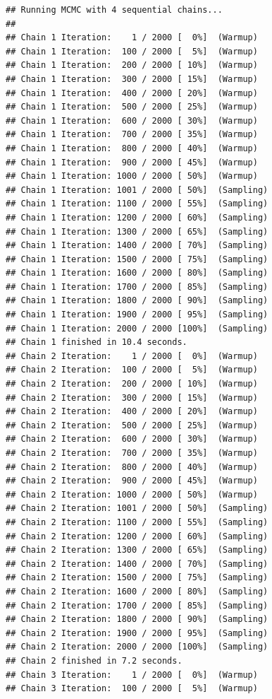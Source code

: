\documentclass[
]{article}
\begin{document}
\begin{verbatim}
## Running MCMC with 4 sequential chains...
## 
## Chain 1 Iteration:    1 / 2000 [  0%]  (Warmup) 
## Chain 1 Iteration:  100 / 2000 [  5%]  (Warmup) 
## Chain 1 Iteration:  200 / 2000 [ 10%]  (Warmup) 
## Chain 1 Iteration:  300 / 2000 [ 15%]  (Warmup) 
## Chain 1 Iteration:  400 / 2000 [ 20%]  (Warmup) 
## Chain 1 Iteration:  500 / 2000 [ 25%]  (Warmup) 
## Chain 1 Iteration:  600 / 2000 [ 30%]  (Warmup) 
## Chain 1 Iteration:  700 / 2000 [ 35%]  (Warmup) 
## Chain 1 Iteration:  800 / 2000 [ 40%]  (Warmup) 
## Chain 1 Iteration:  900 / 2000 [ 45%]  (Warmup) 
## Chain 1 Iteration: 1000 / 2000 [ 50%]  (Warmup) 
## Chain 1 Iteration: 1001 / 2000 [ 50%]  (Sampling) 
## Chain 1 Iteration: 1100 / 2000 [ 55%]  (Sampling) 
## Chain 1 Iteration: 1200 / 2000 [ 60%]  (Sampling) 
## Chain 1 Iteration: 1300 / 2000 [ 65%]  (Sampling) 
## Chain 1 Iteration: 1400 / 2000 [ 70%]  (Sampling) 
## Chain 1 Iteration: 1500 / 2000 [ 75%]  (Sampling) 
## Chain 1 Iteration: 1600 / 2000 [ 80%]  (Sampling) 
## Chain 1 Iteration: 1700 / 2000 [ 85%]  (Sampling) 
## Chain 1 Iteration: 1800 / 2000 [ 90%]  (Sampling) 
## Chain 1 Iteration: 1900 / 2000 [ 95%]  (Sampling) 
## Chain 1 Iteration: 2000 / 2000 [100%]  (Sampling) 
## Chain 1 finished in 10.4 seconds.
## Chain 2 Iteration:    1 / 2000 [  0%]  (Warmup) 
## Chain 2 Iteration:  100 / 2000 [  5%]  (Warmup) 
## Chain 2 Iteration:  200 / 2000 [ 10%]  (Warmup) 
## Chain 2 Iteration:  300 / 2000 [ 15%]  (Warmup) 
## Chain 2 Iteration:  400 / 2000 [ 20%]  (Warmup) 
## Chain 2 Iteration:  500 / 2000 [ 25%]  (Warmup) 
## Chain 2 Iteration:  600 / 2000 [ 30%]  (Warmup) 
## Chain 2 Iteration:  700 / 2000 [ 35%]  (Warmup) 
## Chain 2 Iteration:  800 / 2000 [ 40%]  (Warmup) 
## Chain 2 Iteration:  900 / 2000 [ 45%]  (Warmup) 
## Chain 2 Iteration: 1000 / 2000 [ 50%]  (Warmup) 
## Chain 2 Iteration: 1001 / 2000 [ 50%]  (Sampling) 
## Chain 2 Iteration: 1100 / 2000 [ 55%]  (Sampling) 
## Chain 2 Iteration: 1200 / 2000 [ 60%]  (Sampling) 
## Chain 2 Iteration: 1300 / 2000 [ 65%]  (Sampling) 
## Chain 2 Iteration: 1400 / 2000 [ 70%]  (Sampling) 
## Chain 2 Iteration: 1500 / 2000 [ 75%]  (Sampling) 
## Chain 2 Iteration: 1600 / 2000 [ 80%]  (Sampling) 
## Chain 2 Iteration: 1700 / 2000 [ 85%]  (Sampling) 
## Chain 2 Iteration: 1800 / 2000 [ 90%]  (Sampling) 
## Chain 2 Iteration: 1900 / 2000 [ 95%]  (Sampling) 
## Chain 2 Iteration: 2000 / 2000 [100%]  (Sampling) 
## Chain 2 finished in 7.2 seconds.
## Chain 3 Iteration:    1 / 2000 [  0%]  (Warmup) 
## Chain 3 Iteration:  100 / 2000 [  5%]  (Warmup) 

\end{verbatim}
\end{document}
